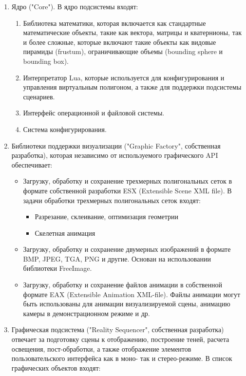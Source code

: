 \begin{enumerate}
	\item	Ядро ("Core"). В ядро подсистемы входят:
	\begin{enumerate}
		\item	Библиотека математики, которая включается как стандартные математические объекты, такие как вектора, матрицы и кватернионы, так и более сложные, которые включают такие объекты как видовые пирамиды (frustum), ограничивающие объемы (bounding sphere и bounding box).
		\item	Интерпретатор Lua, которые используется для конфигурирования и управления виртуальным полигоном, а также для поддержки подсистемы сценариев.
		\item 	Интерфейс операционной и файловой системы.
		\item	Система конфигурирования.
	\end{enumerate}
	\item 	Библиотеки поддержки визуализации ("Graphic Factory", собственная разработка), которая независимо от используемого графического API обеспечивает:
	\begin{itemize}
		\item	Загрузку, обработку и сохранение трехмерных полигональных сеток в формате собственной разработки ESX (Extensible Scene XML file). В задачи обработки трехмерных полигональных сеток входят:
			\begin{itemize}
			\item	Разрезание, склеивание, оптимизация геометрии
			\item	Скелетная анимация
			\end{itemize}
		\item	Загрузку, обработку и сохранение двумерных изображений в формате BMP, JPEG, TGA, PNG и другие. Основан на использовании библиотеки FreeImage.
		\item	Загрузку, обработку и сохранение файлов анимации в собственной формате EAX (Extensible Animation XML-file). Файлы анимации могут быть использованы для анимации визуализируемой сцены, анимацию камеры в демонстрационном режиме и др.
	\end{itemize}
	\item	Графическая подсистема ("Reality Sequencer", собственная разработка) отвечает за подготовку сцены к отображению, построение теней, расчета освещения, пост-обработки, а также отображение элементов пользовательского интерфейса как в моно- так и стерео-режиме. В список графических объектов входят:

\end{enumerate}
